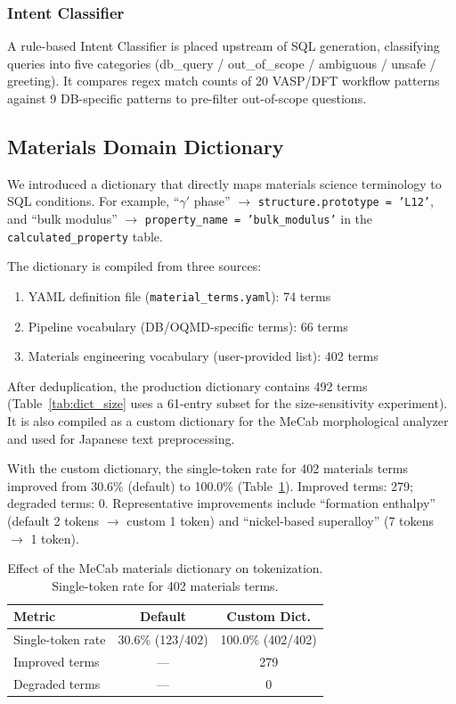 \documentclass{npj-compt.mater}
\begin{document}
\subsubsection{Intent Classifier}
\label{sec:intent_classifier}

A rule-based Intent Classifier is placed upstream of SQL generation,
classifying queries into five categories
(db\_query / out\_of\_scope / ambiguous / unsafe / greeting).
It compares regex match counts of 20 VASP/DFT workflow patterns
against 9 DB-specific patterns to pre-filter out-of-scope questions.

\subsection{Materials Domain Dictionary}
\label{sec:domain_dict}

We introduced a dictionary that directly maps materials science
terminology to SQL conditions.
For example, ``$\gamma'$ phase'' $\to$ \texttt{structure.prototype = 'L12'},
and ``bulk modulus'' $\to$
\texttt{property\_name = 'bulk\_modulus'} in the
\texttt{calculated\_property} table.

The dictionary is compiled from three sources:
\begin{enumerate}
  \item YAML definition file (\texttt{material\_terms.yaml}): 74 terms
  \item Pipeline vocabulary (DB/OQMD-specific terms): 66 terms
  \item Materials engineering vocabulary (user-provided list): 402 terms
\end{enumerate}
After deduplication, the production dictionary contains
492 terms (Table~\ref{tab:dict_size} uses a 61-entry subset for the
size-sensitivity experiment).
It is also compiled as a custom dictionary for the MeCab morphological
analyzer and used for Japanese text preprocessing.

With the custom dictionary, the single-token rate for 402 materials
terms improved from 30.6\% (default) to 100.0\%
(Table~\ref{tab:mecab}).
Improved terms: 279; degraded terms: 0.
Representative improvements include ``formation enthalpy''
(default 2 tokens $\to$ custom 1 token) and
``nickel-based superalloy'' (7 tokens $\to$ 1 token).

\begin{table}[t]
\centering
\caption{Effect of the MeCab materials dictionary on tokenization.
Single-token rate for 402 materials terms.}
\label{tab:mecab}
\small
\begin{tabular}{@{}lcc@{}}
\toprule
Metric & Default & Custom Dict. \\
\midrule
Single-token rate & 30.6\% (123/402) & 100.0\% (402/402) \\
Improved terms & --- & 279 \\
Degraded terms & --- & 0 \\
\bottomrule
\end{tabular}
\end{table}
\end{document}
